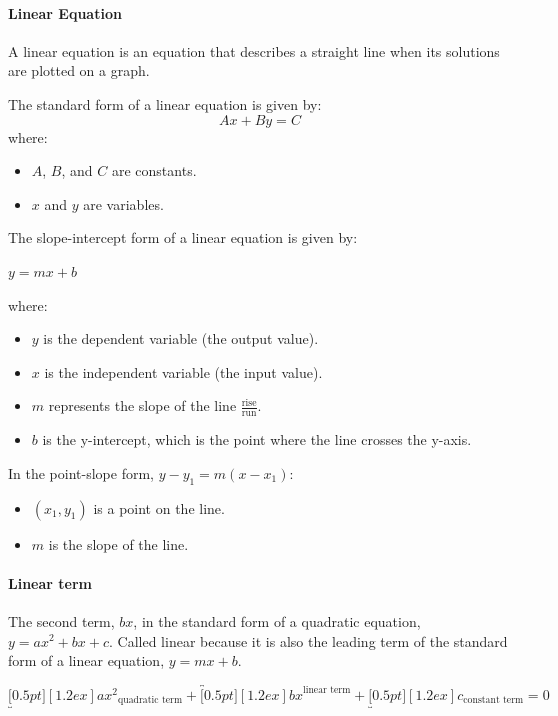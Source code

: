 \documentclass[12pt]{article}
\begin{document}
\paragraph{Linear Equation}
A linear equation is an equation that describes a straight line when its solutions are plotted on a graph.

The standard form of a linear equation is given by:
\[
Ax + By = C
\]
where:
\begin{itemize}
    \item \( A \), \( B \), and \( C \) are constants.
    \item \( x \) and \( y \) are variables.
\end{itemize}

The slope-intercept form of a linear equation is given by:

$y = mx + b$

where:
\begin{itemize}
    \item \( y \) is the dependent variable (the output value).
    \item \( x \) is the independent variable (the input value).
    \item \( m \) represents the slope of the line $\frac{\textrm{rise}}{\textrm{run}}$.
    \item \( b \) is the y-intercept, which is the point where the line crosses the y-axis.
\end{itemize}

In the point-slope form, \(y - y_1 = m(x - x_1)\):
\begin{itemize}
    \item \((x_1, y_1)\) is a point on the line.
    \item \(m\) is the slope of the line.
\end{itemize}

\paragraph{Linear term}
The second term, $bx$, in the standard form of a quadratic equation, $y=ax^2+bx+c$. Called linear because it is also the leading term of the standard form of a linear equation, $y=mx+b$.

\begin{center}
{\Large$\underbracket[0.5pt][1.2ex]{ax^2}_{\textrm{quadratic term}}+\overbracket[0.5pt][1.2ex]{bx}^{\textrm{linear term}}+\underbracket[0.5pt][1.2ex]{c}_{\textrm{constant term}}=0$}
\end{center}
\end{document}
